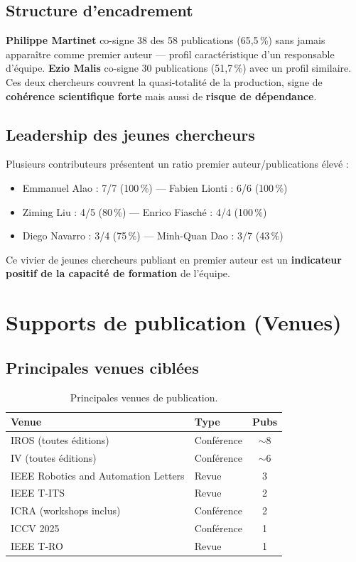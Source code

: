 \documentclass[a4paper,11pt]{article}
\begin{document}
\subsection{Structure d'encadrement}

\textbf{Philippe Martinet} co-signe 38 des 58 publications (65,5\,\%) sans jamais apparaître comme premier auteur --- profil caractéristique d'un responsable d'équipe. \textbf{Ezio Malis} co-signe 30 publications (51,7\,\%) avec un profil similaire. Ces deux chercheurs couvrent la quasi-totalité de la production, signe de \textbf{cohérence scientifique forte} mais aussi de \textbf{risque de dépendance}.

\subsection{Leadership des jeunes chercheurs}

Plusieurs contributeurs présentent un ratio premier auteur/publications élevé :

\begin{itemize}[nosep]
  \item Emmanuel Alao : 7/7 (100\,\%) --- Fabien Lionti : 6/6 (100\,\%)
  \item Ziming Liu : 4/5 (80\,\%) --- Enrico Fiasché : 4/4 (100\,\%)
  \item Diego Navarro : 3/4 (75\,\%) --- Minh-Quan Dao : 3/7 (43\,\%)
\end{itemize}

Ce vivier de jeunes chercheurs publiant en premier auteur est un \textbf{indicateur positif de la capacité de formation} de l'équipe.

\section{Supports de publication (Venues)}

\subsection{Principales venues ciblées}

\begin{table}[h!]
\centering
\begin{tabular}{llc}
\toprule
\textbf{Venue} & \textbf{Type} & \textbf{Pubs} \\
\midrule
IROS (toutes éditions) & Conférence & $\sim$8 \\
IV (toutes éditions) & Conférence & $\sim$6 \\
IEEE Robotics and Automation Letters & Revue & 3 \\
IEEE T-ITS & Revue & 2 \\
ICRA (workshops inclus) & Conférence & 2 \\
ICCV 2025 & Conférence & 1 \\
IEEE T-RO & Revue & 1 \\
\bottomrule
\end{tabular}
\caption{Principales venues de publication.}
\end{table}
\end{document}
